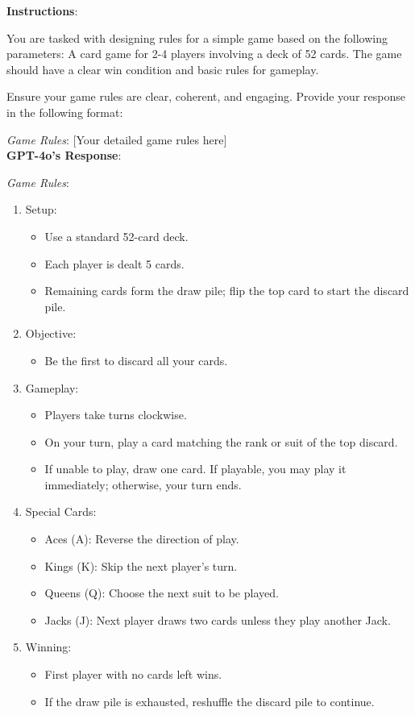 \begin{tcolorbox}[breakable,boxrule=0.5pt,sharp corners,fontupper=\small,
colback=green!10, colframe=green!50!black, title={Success: Creative Card Game Rules}]
\textbf{Instructions}:

You are tasked with designing rules for a simple game based on the following parameters: A card game for 2-4 players involving a deck of 52 cards. The game should have a clear win condition and basic rules for gameplay.

Ensure your game rules are clear, coherent, and engaging. Provide your response in the following format:

\textit{Game Rules}: [Your detailed game rules here]\\

\textbf{GPT-4o's Response}:

\textit{Game Rules}:
\begin{enumerate}
    \item Setup:
    \begin{itemize}
        \item Use a standard 52-card deck.
        \item Each player is dealt 5 cards.
        \item Remaining cards form the draw pile; flip the top card to start the discard pile.
    \end{itemize}
    \item Objective:
    \begin{itemize}
        \item Be the first to discard all your cards.
    \end{itemize}
    \item Gameplay:
    \begin{itemize}
        \item Players take turns clockwise.
        \item On your turn, play a card matching the rank or suit of the top discard.
        \item If unable to play, draw one card. If playable, you may play it immediately; otherwise, your turn ends.
    \end{itemize}
    \item Special Cards:
    \begin{itemize}
        \item Aces (A): Reverse the direction of play.
        \item Kings (K): Skip the next player's turn.
        \item Queens (Q): Choose the next suit to be played.
        \item Jacks (J): Next player draws two cards unless they play another Jack.
    \end{itemize}
    \item Winning:
    \begin{itemize}
        \item First player with no cards left wins.
        \item If the draw pile is exhausted, reshuffle the discard pile to continue.
    \end{itemize}
\end{enumerate}


\end{tcolorbox}
